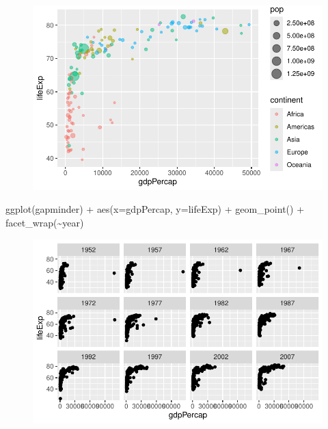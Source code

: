 \documentclass[
  letterpaper,
  DIV=11,
  numbers=noendperiod]{scrartcl}
\newenvironment{Shaded}{\begin{snugshade}}{\end{snugshade}}
\newcommand{\AttributeTok}[1]{\textcolor[rgb]{0.40,0.45,0.13}{#1}}
\newcommand{\FunctionTok}[1]{\textcolor[rgb]{0.28,0.35,0.67}{#1}}
\newcommand{\NormalTok}[1]{\textcolor[rgb]{0.00,0.23,0.31}{#1}}
\newcommand{\SpecialCharTok}[1]{\textcolor[rgb]{0.37,0.37,0.37}{#1}}
\begin{document}
\begin{figure}[H]

{\centering \includegraphics{Class05_files/figure-pdf/unnamed-chunk-30-1.pdf}

}

\end{figure}

\begin{Shaded}
\begin{Highlighting}[]
\FunctionTok{ggplot}\NormalTok{(gapminder) }\SpecialCharTok{+}
  \FunctionTok{aes}\NormalTok{(}\AttributeTok{x=}\NormalTok{gdpPercap, }\AttributeTok{y=}\NormalTok{lifeExp) }\SpecialCharTok{+}
  \FunctionTok{geom\_point}\NormalTok{() }\SpecialCharTok{+}
  \FunctionTok{facet\_wrap}\NormalTok{(}\SpecialCharTok{\textasciitilde{}}\NormalTok{year)}
\end{Highlighting}
\end{Shaded}

\begin{figure}[H]

{\centering \includegraphics{Class05_files/figure-pdf/unnamed-chunk-31-1.pdf}

}

\end{figure}
\end{document}
